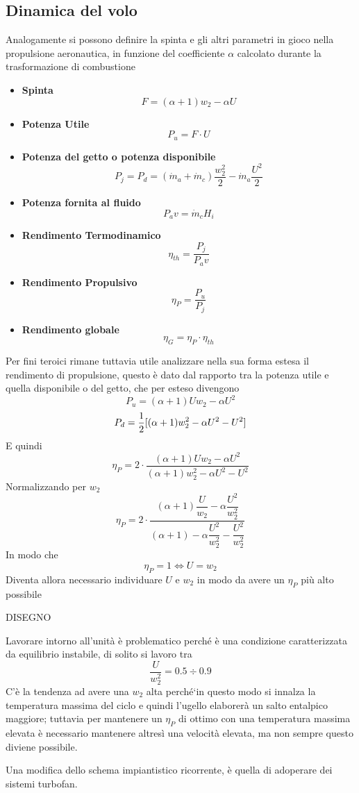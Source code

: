 \subsection{Dinamica del volo}
\begin{adjustwidth}{2in}{}
	Analogamente si possono definire la spinta e gli altri parametri in gioco nella propulsione aeronautica, in funzione del coefficiente $\alpha$ calcolato durante la trasformazione di combustione
	\begin{itemize}
		\item \textbf{Spinta}
		\[F = (\alpha+1)w_2 - \alpha U\]
		\item \textbf{Potenza Utile}
		\[P_u = F\cdot U\]
		\item \textbf{Potenza del getto o potenza disponibile}
		\[P_j = P_d = (\dot{m}_a +\dot{m}_c)\dfrac{w^2_2}{2} - \dot{m}_a\dfrac{U^2}{2}\]
		\item \textbf{Potenza fornita al fluido}
		\[P_av = \dot{m}_cH_i\]
		\item \textbf{Rendimento Termodinamico}
		\[\eta_{th} = \dfrac{P_j}{P_av}\]
		\item \textbf{Rendimento Propulsivo}
		\[\eta_P = \dfrac{P_u}{P_j}\]
		\item \textbf{Rendimento globale}
		\[\eta_G = \eta_P\cdot\eta_{th}\]
	\end{itemize}
	Per fini teroici rimane tuttavia utile analizzare nella sua forma estesa il rendimento di propulsione, questo è dato dal rapporto tra la potenza utile e quella disponibile o del getto, che per esteso divengono
	\[P_u = (\alpha+1)Uw_2 - \alpha U^2\]
	\[P_d = {1\over2}[(\alpha+1)w^2_2 - \alpha U^2 - U^2]\]
	E quindi
	\[\eta_P = 2\cdot\dfrac{(\alpha+1)Uw_2 - \alpha U^2}{(\alpha+1)w^2_2 - \alpha U^2 - U^2}\]
	Normalizzando per $w_2$
	\[\eta_P = 2\cdot\dfrac{(\alpha+1)\dfrac{U}{w_2} - \alpha \dfrac{U^2}{w_2^2}}{(\alpha+1) - \alpha \dfrac{U^2}{w_2^2} - \dfrac{U^2}{w_2^2}}\]
	In modo che 
	\[\eta_P = 1 \Leftrightarrow U = w_2\]
	Diventa allora necessario individuare $U$ e $w_2$ in modo da avere un $\eta_P$ più alto possibile
	
	DISEGNO
	
	Lavorare intorno all'unità è problematico perché è una condizione caratterizzata da equilibrio instabile, di solito si lavoro tra 
	\[\dfrac{U}{w_2^2} = 0.5\div0.9\]
	C'è la tendenza ad avere una $w_2$ alta perché`in questo modo si innalza la temperatura massima del ciclo e quindi l'ugello elaborerà un salto entalpico maggiore; tuttavia per mantenere un $\eta_P$ di ottimo con una temperatura massima elevata è necessario mantenere altresì una velocità elevata, ma non sempre questo diviene possibile. 
	
	Una modifica dello schema impiantistico ricorrente, è quella di adoperare dei sistemi turbofan. 
\end{adjustwidth}
